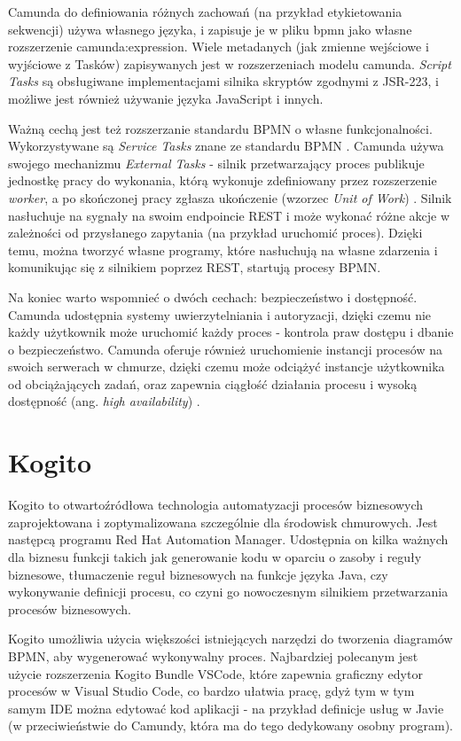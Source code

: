 \documentclass[declaration,shortabstract,mgr]{iithesis}
\newcommand{\bpmn}{BPMN }
\newcommand{\bpmnnospace}{BPMN}
\begin{document}
Camunda do definiowania różnych zachowań (na przykład etykietowania sekwencji) używa własnego języka, i zapisuje je w pliku bpmn jako własne rozszerzenie camunda:expression. Wiele metadanych (jak zmienne wejściowe i wyjściowe z Tasków) zapisywanych jest w rozszerzeniach modelu camunda. \textit{Script Tasks} są obsługiwane implementacjami silnika skryptów zgodnymi z JSR-223, i możliwe jest również używanie języka JavaScript i innych.

Ważną cechą jest też rozszerzanie standardu \bpmn o własne funkcjonalności. Wykorzystywane są \textit{Service Tasks} znane ze standardu \bpmn. Camunda używa swojego mechanizmu \textit{External Tasks} - silnik przetwarzający proces publikuje jednostkę pracy do wykonania, którą wykonuje zdefiniowany przez rozszerzenie \textit{worker}, a po skończonej pracy zgłasza ukończenie (wzorzec \textit{Unit of Work}) \cite{camunda-docs-external-tasks}. Silnik nasłuchuje na sygnały na swoim endpoincie REST i może wykonać różne akcje w zależności od przysłanego zapytania (na przykład uruchomić proces). Dzięki temu, można tworzyć własne programy, które nasłuchują na własne zdarzenia i komunikując się z silnikiem poprzez REST, startują procesy \bpmnnospace.

Na koniec warto wspomnieć o dwóch cechach: bezpieczeństwo i dostępność. Camunda udostępnia systemy uwierzytelniania i autoryzacji, dzięki czemu nie każdy użytkownik może uruchomić każdy proces - kontrola praw dostępu i dbanie o bezpieczeństwo. Camunda oferuje również uruchomienie instancji procesów na swoich serwerach w chmurze, dzięki czemu może odciążyć instancje użytkownika od obciążających zadań, oraz zapewnia ciągłość działania procesu i wysoką dostępność (ang. \textit{high availability}) \cite{camunda-blog-cloud}.

\section{Kogito}

Kogito to otwartoźródłowa technologia automatyzacji procesów biznesowych zaprojektowana i zoptymalizowana szczególnie dla środowisk chmurowych. Jest następcą programu Red Hat Automation Manager. Udostępnia on kilka ważnych dla biznesu funkcji takich jak generowanie kodu w oparciu o zasoby i reguły biznesowe, tłumaczenie reguł biznesowych na funkcje języka Java, czy wykonywanie definicji procesu, co czyni go nowoczesnym silnikiem przetwarzania procesów biznesowych. 

Kogito umożliwia użycia większości istniejących narzędzi do tworzenia diagramów \bpmnnospace, aby wygenerować wykonywalny proces. Najbardziej polecanym jest użycie rozszerzenia Kogito Bundle VSCode, które zapewnia graficzny edytor procesów w Visual Studio Code, co bardzo ułatwia pracę, gdyż tym w tym samym IDE można edytować kod aplikacji - na przykład definicje usług w Javie (w przeciwieństwie do Camundy, która ma do tego dedykowany osobny program).
\end{document}
